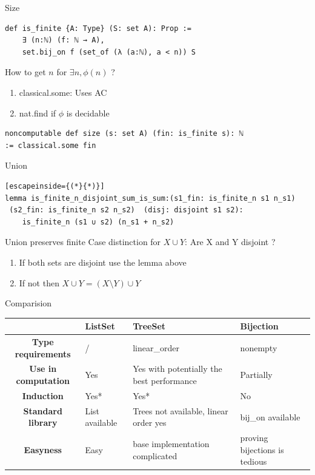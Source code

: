 \documentclass[aspectratio=169]{beamer}
\begin{document}
    \begin{frame}[fragile]{Size}
\begin{lstlisting}
def is_finite {A: Type} (S: set A): Prop := 
    ∃ (n:ℕ) (f: ℕ → A), 
    set.bij_on f (set_of (λ (a:ℕ), a < n)) S
\end{lstlisting}

How to get $n$ for $\exists n, \phi(n)$ ?
\begin{enumerate}
    \item classical.some: Uses AC
    \item nat.find if $\phi$ is decidable
\end{enumerate}
\pause
    \begin{lstlisting}
noncomputable def size (s: set A) (fin: is_finite s): ℕ
:= classical.some fin
\end{lstlisting}
    \end{frame}



\begin{frame}[fragile]{Union}
    \begin{lstlisting}[escapeinside={(*}{*)}]
lemma is_finite_n_disjoint_sum_is_sum:(s1_fin: is_finite_n s1 n_s1)
 (s2_fin: is_finite_n s2 n_s2)  (disj: disjoint s1 s2): 
    is_finite_n (s1 ∪ s2) (n_s1 + n_s2)
    \end{lstlisting}

    \pause
    \begin{block}{Union preserves finite}
        Case distinction for $X \cup Y$: Are X and Y disjoint ?
        \begin{enumerate}
            \item If both sets are disjoint use the lemma above
            \item If not then $X \cup Y = (X \setminus Y) \cup Y$
        \end{enumerate}
    \end{block}
\end{frame}

\begin{frame}{Comparision}
    
    \begin{tabular}{|c|p{3cm}|p{3cm}|p{3cm}|}
        \hline
        & \textbf{ListSet} & \textbf{TreeSet} & \textbf{Bijection} \\
        \hline
        \textbf{Type requirements} & / & linear\_order & nonempty \\
        \hline
        \textbf{Use in computation} & Yes & Yes with potentially the best performance & Partially \\
        \hline
        \textbf{Induction} & Yes* & Yes* & No \\
        \hline
        \textbf{Standard library} & List available & Trees not available, linear order yes & bij\_on available \\
        \hline
        \textbf{Easyness} & Easy & base implementation complicated & proving bijections is tedious \\
        \hline
    \end{tabular}
\end{frame}
\end{document}
